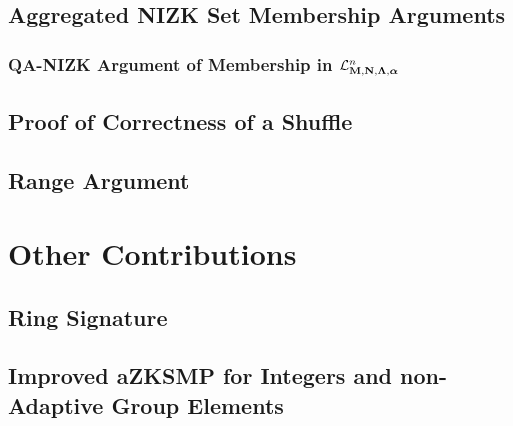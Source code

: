     \section{Aggregated NIZK Set Membership Arguments} \label{sec:aZKSMP}

        

        \subsection{QA-NIZK Argument of Membership in $\mathcal{L}_{\mathbf{{M}},\mathbf{{N}},\mathbf{{\Lambda}},{\boldsymbol \alpha}}^n$} \label{sec:bin-lan-constr}

            

    \section{Proof of Correctness of a Shuffle} \label{sec:shuffle}

        

    \section{Range Argument} \label{sec:range-proof}

        

\chapter{Other Contributions}

    \section{Ring Signature}

        

    \section{Improved aZKSMP for Integers and non-Adaptive Group Elements}

